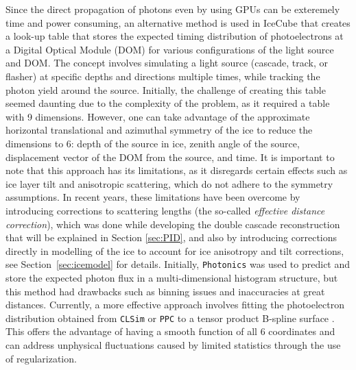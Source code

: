 Since the direct propagation of photons even by using GPUs can be exteremely time and power consuming, an alternative method is used in IceCube that creates a look-up table that stores the expected timing distribution of photoelectrons at a Digital Optical Module (DOM) for various configurations of the light source and DOM. The concept involves simulating a light source (cascade, track, or flasher) at specific depths and directions multiple times, while tracking the photon yield around the source. Initially, the challenge of creating this table seemed daunting due to the complexity of the problem, as it required a table with 9 dimensions. However, one can take advantage of the approximate horizontal translational and azimuthal symmetry of the ice to reduce the dimensions to 6: depth of the source in ice, zenith angle of the source, displacement vector of the DOM from the source, and time. It is important to note that this approach has its limitations, as it disregards certain effects such as ice layer tilt and anisotropic scattering, which do not adhere to the symmetry assumptions. In recent years, these limitations have been overcome by introducing corrections to scattering lengths (the so-called \emph{effective distance correction}), which was done while developing the double cascade reconstruction  that will be explained in Section \ref{sec:PID}, and also by introducing corrections directly in modelling of the ice to account for ice anisotropy and tilt corrections, see Section~\ref{sec:icemodel} for details. Initially, \texttt{Photonics} was used to predict and store the expected photon flux in a multi-dimensional histogram structure, but this method had drawbacks such as binning issues and inaccuracies at great distances. Currently, a more effective approach involves fitting the photoelectron distribution obtained from \texttt{CLSim} or \texttt{PPC} to a tensor product B-spline surface . This offers the advantage of having a smooth function of all 6 coordinates and can address unphysical fluctuations caused by limited statistics through the use of regularization.

